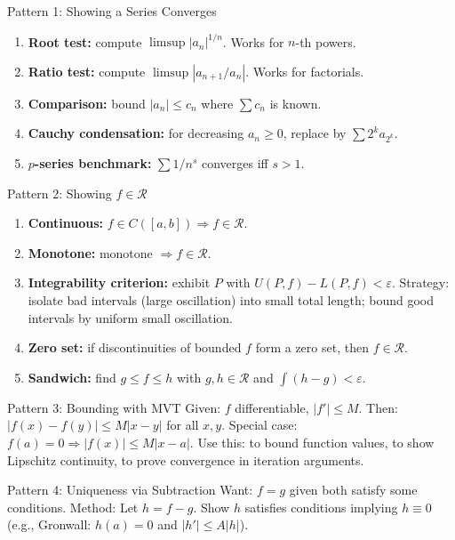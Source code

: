 \documentclass[11pt]{article}
\newcommand{\eps}{\varepsilon}
\theoremstyle{myplain}
\theoremstyle{definition}
\theoremstyle{remark}
\begin{document}
\begin{technique}{Pattern 1: Showing a Series Converges}
\begin{enumerate}
  \item \textbf{Root test:} compute $\limsup|a_n|^{1/n}$. Works for $n$-th powers.
  \item \textbf{Ratio test:} compute $\limsup|a_{n+1}/a_n|$. Works for factorials.
  \item \textbf{Comparison:} bound $|a_n| \leq c_n$ where $\sum c_n$ is known.
  \item \textbf{Cauchy condensation:} for decreasing $a_n \geq 0$, replace by $\sum 2^k a_{2^k}$.
  \item \textbf{$p$-series benchmark:} $\sum 1/n^s$ converges iff $s > 1$.
\end{enumerate}
\end{technique}

\begin{technique}{Pattern 2: Showing $f \in \mathscr{R}$}
\begin{enumerate}
  \item \textbf{Continuous:} $f \in C([a,b]) \Rightarrow f \in \mathscr{R}$.
  \item \textbf{Monotone:} monotone $\Rightarrow f \in \mathscr{R}$.
  \item \textbf{Integrability criterion:} exhibit $P$ with $U(P,f) - L(P,f) < \eps$. Strategy: isolate bad intervals (large oscillation) into small total length; bound good intervals by uniform small oscillation.
  \item \textbf{Zero set:} if discontinuities of bounded $f$ form a zero set, then $f \in \mathscr{R}$.
  \item \textbf{Sandwich:} find $g \leq f \leq h$ with $g, h \in \mathscr{R}$ and $\int(h-g) < \eps$.
\end{enumerate}
\end{technique}

\begin{technique}{Pattern 3: Bounding with MVT}
Given: $f$ differentiable, $|f'| \leq M$.
Then: $|f(x) - f(y)| \leq M|x-y|$ for all $x, y$.
Special case: $f(a) = 0 \Rightarrow |f(x)| \leq M|x-a|$.
Use this: to bound function values, to show Lipschitz continuity, to prove convergence in iteration arguments.
\end{technique}

\begin{technique}{Pattern 4: Uniqueness via Subtraction}
Want: $f = g$ given both satisfy some conditions.
Method: Let $h = f - g$. Show $h$ satisfies conditions implying $h \equiv 0$ (e.g., Gronwall: $h(a) = 0$ and $|h'| \leq A|h|$).
\end{technique}
\end{document}
